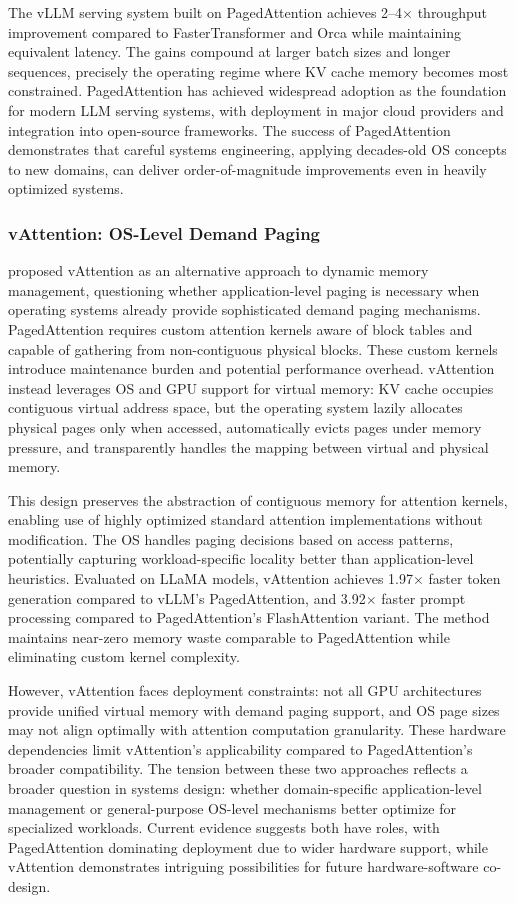 The vLLM serving system built on PagedAttention achieves 2--4$\times$ throughput improvement compared to FasterTransformer and Orca while maintaining equivalent latency. The gains compound at larger batch sizes and longer sequences, precisely the operating regime where KV cache memory becomes most constrained. PagedAttention has achieved widespread adoption as the foundation for modern LLM serving systems, with deployment in major cloud providers and integration into open-source frameworks. The success of PagedAttention demonstrates that careful systems engineering, applying decades-old OS concepts to new domains, can deliver order-of-magnitude improvements even in heavily optimized systems.

\subsubsection{vAttention: OS-Level Demand Paging}

\citet{liu2024vattention} proposed vAttention as an alternative approach to dynamic memory management, questioning whether application-level paging is necessary when operating systems already provide sophisticated demand paging mechanisms. PagedAttention requires custom attention kernels aware of block tables and capable of gathering from non-contiguous physical blocks. These custom kernels introduce maintenance burden and potential performance overhead. vAttention instead leverages OS and GPU support for virtual memory: KV cache occupies contiguous virtual address space, but the operating system lazily allocates physical pages only when accessed, automatically evicts pages under memory pressure, and transparently handles the mapping between virtual and physical memory.

This design preserves the abstraction of contiguous memory for attention kernels, enabling use of highly optimized standard attention implementations without modification. The OS handles paging decisions based on access patterns, potentially capturing workload-specific locality better than application-level heuristics. Evaluated on LLaMA models, vAttention achieves 1.97$\times$ faster token generation compared to vLLM's PagedAttention, and 3.92$\times$ faster prompt processing compared to PagedAttention's FlashAttention variant. The method maintains near-zero memory waste comparable to PagedAttention while eliminating custom kernel complexity.

However, vAttention faces deployment constraints: not all GPU architectures provide unified virtual memory with demand paging support, and OS page sizes may not align optimally with attention computation granularity. These hardware dependencies limit vAttention's applicability compared to PagedAttention's broader compatibility. The tension between these two approaches reflects a broader question in systems design: whether domain-specific application-level management or general-purpose OS-level mechanisms better optimize for specialized workloads. Current evidence suggests both have roles, with PagedAttention dominating deployment due to wider hardware support, while vAttention demonstrates intriguing possibilities for future hardware-software co-design.

